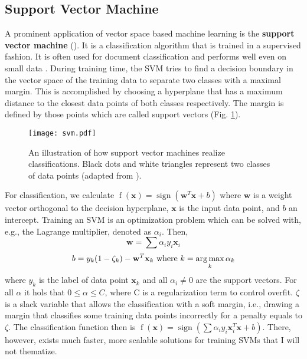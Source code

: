 \subsection{Support Vector Machine}
  A prominent application of vector space based machine learning is the \textbf{support vector machine} ().
  It is a classification algorithm that is trained in a supervised fashion. It is often used for document classification and performs well even on small data \citep{Manning2008}.
  During training time, the SVM tries to find a decision boundary in the vector space of the training data to separate two classes with a maximal margin.
  This is accomplished by choosing a hyperplane that has a maximum distance to the closest data points of both classes respectively. The margin is defined by those points which are called support vectors (Fig. \ref{fig:svm}).
  \begin{figure}[h!]
      \centering
      \texttt{[image: svm.pdf]}
      \caption{An illustration of how support vector machines realize classifications. Black dots and white triangles represent two classes of data points (adapted from \cite{Manning2008}).}
      \label{fig:svm}
  \end{figure}
  For classification, we calculate $\operatorname{f}(\mathbf{x}) = \operatorname{sign}(\mathbf{w}^{T}\mathbf{x} + b)$ where $\mathbf{w}$ is a weight vector orthogonal to the decision hyperplane, $\mathbf{x}$ is the input data point, and $b$ an intercept.
  Training an SVM is an optimization problem which can be solved with, e.g., the Lagrange multiplier, denoted as $\alpha_i$.
  Then,
    \[\mathbf{w} = \sum \alpha_i y_i \mathbf{x}_i \]
    \[b = y_k (1-\zeta_k) - \mathbf{w}^T \mathbf{x}_k \text{ where }k = \operatorname*{arg\,max}_k \alpha_k \]
  where $y_k$ is the label of data point $\mathbf{x}_k$ and all $\alpha_i \neq 0$ are the support vectors. For all $\alpha$ it hols that $0 \leq \alpha \leq C$, where C is a regularization term to control overfit. $\zeta$ is a slack variable that allows the classification with a soft margin, i.e., drawing a margin that classifies some training data points incorrectly for a penalty equals to $\zeta$.
  The classification function then is $\operatorname{f}(\mathbf{x}) = \operatorname{sign}(\sum \alpha_i y_i \mathbf{x}^{T}_i\mathbf{x} + b)$.
  There, however, exists much faster, more scalable solutions for training SVMs that I will not thematize.

